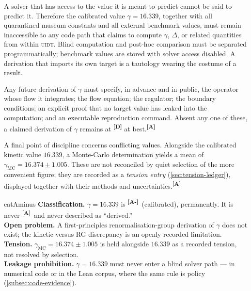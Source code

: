 \documentclass[12pt,a4paper,twoside]{article}
\theoremstyle{plain}
\theoremstyle{definition}
\theoremstyle{remark}
\newcommand{\UIDT}{\textsc{uidt}}
\newcommand{\catmark}[1]{\textsuperscript{\textsf{\textbf{[#1]}}}}
\newcommand{\GammaGeom}{16.339} %
\newcommand{\GammaMC}{16.374 \pm 1.005} %
\begin{document}
\begin{governancebox}
A solver that has access to the value it is meant to predict cannot be
said to predict it. Therefore the calibrated value $\gamma = 16.339$,
together with all quarantined museum constants and all external
benchmark values, must remain inaccessible to any code path that claims
to compute $\gamma$, $\Delta$, or related quantities from within \UIDT.
Blind computation and post-hoc comparison must be separated
programmatically; benchmark values are stored with solver access
disabled. A derivation that imports its own target is a tautology
wearing the costume of a result.
\end{governancebox}

\noindent Any future derivation of $\gamma$ must specify, in advance and
in public, the operator whose flow it integrates; the flow equation; the
regulator; the boundary conditions; an explicit proof that no target
value has leaked into the computation; and an executable reproduction
command. Absent any one of these, a claimed derivation of $\gamma$
remains at \catmark{D} at best.\catmark{A}

A final point of discipline concerns conflicting values. Alongside the
calibrated kinetic value $16.339$, a Monte-Carlo determination yields a
mean of $\gamma_{\mathrm{MC}} = \GammaMC$. These are not reconciled by
quiet selection of the more convenient figure; they are recorded as a
\emph{tension entry} (\cref{sec:tension-ledger}), displayed together
with their methods and uncertainties.\catmark{A}

\begin{evidencebox}{catAminus}
\textbf{Classification.} $\gamma = \GammaGeom$ is \catmark{A-}\
(calibrated), permanently. It is never \catmark{A}\ and never described
as ``derived.''\\[0.3em]
\textbf{Open problem.} A first-principles renormalisation-group
derivation of $\gamma$ does not exist; the kinetic-versus-RG discrepancy
is an openly recorded limitation.\\[0.3em]
\textbf{Tension.} $\gamma_{\mathrm{MC}} = \GammaMC$ is held alongside
$16.339$ as a recorded tension, not resolved by selection.\\[0.3em]
\textbf{Leakage prohibition.} $\gamma = 16.339$ must never enter a blind
solver path --- in numerical code or in the Lean corpus, where the same
rule is policy (\cref{subsec:code-evidence}).
\end{evidencebox}
\end{document}
